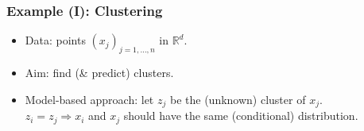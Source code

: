 \documentclass{beamer}
\begin{document}
\begin{frame} \frametitle{Example (I): Clustering}
\begin{itemize}
\item Data: points $(x_j)_{j=1,\ldots,n}$ in ${\mathbb R}^d$.
\item Aim: find (\& predict) clusters.
\item Model-based approach: let $z_j$ be the (unknown) cluster of $x_j$.\\
 $z_i=z_j \Rightarrow x_i$ and $x_j$ should have the same (conditional) distribution.
\end{itemize}
\begin{center}
%
\end{center}
\end{frame}
\end{document}
